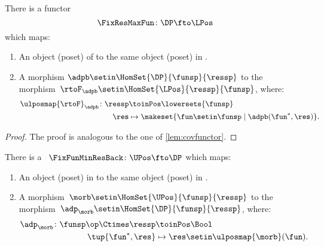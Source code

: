 \begin{lemma}
    \label{lem:confunctor}
    There is a functor
    \begin{equation}
        \FixResMaxFun\colon \DP \fto \LPos
    \end{equation}
    which maps:
    \begin{enumerate}
        \item An object (poset) of \DP to the same object (poset) in \LPos.
        \item A morphism $\adpb \setin \HomSet{\DP}{\funsp}{\ressp}$ to the morphism~$\rtoF_\adpb\setin \HomSet{\LPos}{\ressp}{\funsp}$, where:
              \begin{equation}
                  \begin{aligned}
                      \ulposmap{\rtoF}_\adpb\colon \ressp & \toinPos \lowersets{\funsp} \\
                      \res                                & \mapsto \makeset{ \fun \setin \funsp \mid \adpb(\fun^*,\res)}.
                  \end{aligned}
              \end{equation}
    \end{enumerate}
\end{lemma}

\begin{proof}
    The proof is analogous to the one of \cref{lem:covfunctor}.
\end{proof}

\begin{lemma}
    \label{lem:covfunctorback}
    There is a ~$\FixFunMinResBack\colon \UPos \fto \DP$ which maps:
    \begin{enumerate}
        \item An object (poset) in \UPos to the same object (poset) in \DP.
        \item A morphism~$\morb\setin \HomSet{\UPos}{\funsp}{\ressp}$ to the morphism~$\adp_\morb \setin \HomSet{\DP}{\funsp}{\ressp}$, where:
              \begin{equation}
                  \begin{aligned}
                      \adp_\morb\colon \funsp\op \Ctimes \ressp & \toinPos \Bool \\
                      \tup{\fun^*,\res}                         & \mapsto \res \setin \ulposmap{\morb}(\fun).
                  \end{aligned}
              \end{equation}
    \end{enumerate}
\end{lemma}

